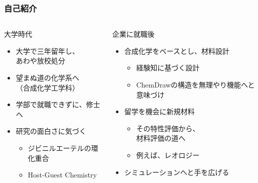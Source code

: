 \documentclass[12pt, dvipdfmx]{beamer}
\begin{document}
\begin{frame}
	\frametitle{自己紹介}
    \vspace{-3mm}
        \begin{columns}[T, onlytextwidth]
                \begin{block}{大学時代}
                    \begin{itemize}
                        \item 大学で三年留年し、\\あわや放校処分
                        \item 望まぬ道の化学系へ\\（合成化学工学科）
                        \item 学部で就職できずに、修士へ
                        \item 研究の面白さに気づく
                        \begin{itemize}
                            \item ジビニルエーテルの環化重合
                            \item Host-Guest Chemistry
                        \end{itemize}
                    \end{itemize}
                \end{block}
                \begin{exampleblock}{企業に就職後}
                    \begin{itemize}
                        \item 合成化学をベースとし、材料設計
                        \begin{itemize}
                            \item 経験知に基づく設計
                            \item ChemDrawの構造を無理やり機能へと意味づけ
                        \end{itemize}
                        \item 留学を機会に新規材料
                        \begin{itemize}
                            \item その特性評価から、\\材料評価の道へ
                            \item 例えば、レオロジー
                        \end{itemize}
                        \item シミュレーションへと手を広げる
                    \end{itemize}
                \end{exampleblock}
        \end{columns}
\end{frame}
\end{document}
